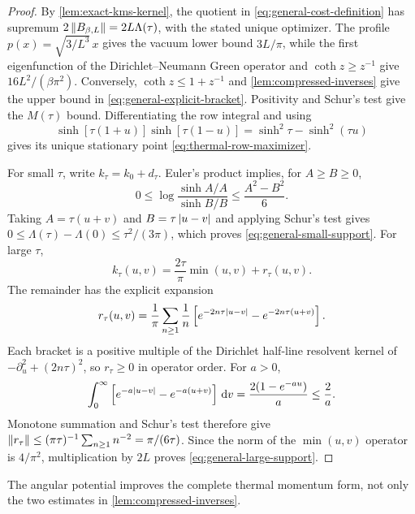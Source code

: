 \begin{proof}
By \cref{lem:exact-kms-kernel}, the quotient in
\cref{eq:general-cost-definition} has supremum
$2\left\lVert B_{\beta,L}\right\rVert=2L\Lambda(\tau)$, with the stated unique optimizer.
The profile $p(x)=\sqrt{3/L^3}\,x$ gives the vacuum lower bound $3L/\pi$,
while the first eigenfunction of the Dirichlet--Neumann Green operator and
$\coth z\geq z^{-1}$ give $16L^2/(\beta\pi^2)$.  Conversely,
$\coth z\leq1+z^{-1}$ and \cref{lem:compressed-inverses} give the upper bound
in \cref{eq:general-explicit-bracket}.  Positivity and Schur's test give the
$M(\tau)$ bound.  Differentiating the row integral and using
\begin{equation}
 \sinh[\tau(1+u)]\sinh[\tau(1-u)]
 =\sinh^2\tau-\sinh^2(\tau u)
\end{equation}
gives its unique stationary point \cref{eq:thermal-row-maximizer}.

For small $\tau$, write $k_\tau=k_0+d_\tau$.  Euler's product implies, for
$A\geq B\geq0$,
\begin{equation}
 0\leq\log\frac{\sinh A/A}{\sinh B/B}
 \leq\frac{A^2-B^2}{6}.
\end{equation}
Taking $A=\tau(u+v)$ and $B=\tau\left\lvert u-v\right\rvert$ and applying Schur's test gives
$0\leq\Lambda(\tau)-\Lambda(0)\leq\tau^2/(3\pi)$, which proves
\cref{eq:general-small-support}.  For large $\tau$,
\begin{equation}
 k_\tau(u,v)=\frac{2\tau}{\pi}\min(u,v)+r_\tau(u,v).
\end{equation}
The remainder has the explicit expansion
\begin{equation}
 r_\tau(u,v)=\frac1\pi\sum_{n\geq1}\frac1n
 \left[e^{-2n\tau\left\lvert u-v\right\rvert}-e^{-2n\tau(u+v)}\right].
 \label{eq:large-support-resolvent-series}
\end{equation}
Each bracket is a positive multiple of the Dirichlet half-line resolvent
kernel of $-\partial_u^2+(2n\tau)^2$, so $r_\tau\geq0$ in operator order.
For $a>0$,
\begin{equation}
 \int_0^\infty
 \left[e^{-a\left\lvert u-v\right\rvert}-e^{-a(u+v)}\right]\,\mathrm d v
 =\frac{2(1-e^{-au})}{a}\leq\frac2a.
\end{equation}
Monotone summation and Schur's test therefore give
$\left\lVert r_\tau\right\rVert\leq(\pi\tau)^{-1}\sum_{n\geq1}n^{-2}
=\pi/(6\tau)$.  Since the norm of the $\min(u,v)$ operator is $4/\pi^2$,
multiplication by $2L$ proves \cref{eq:general-large-support}.
\end{proof}

The angular potential improves the complete thermal momentum form, not only
the two estimates in \cref{lem:compressed-inverses}.


